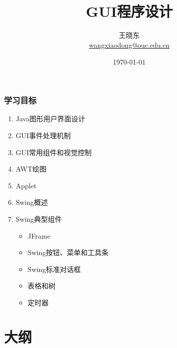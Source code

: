 
\title[KevinW@OUC]{\\  
  GUI程序设计}
\author[王晓东]{王晓东\\
  \href{mailto:wangxiaodong@ouc.edu.cn}{\footnotesize wangxiaodong@ouc.edu.cn}}
\date{\today}


\frame{\titlepage}
\begin{frame}
  \frametitle{学习目标}
  \begin{enumerate}
  \item Java图形用户界面设计
  \item GUI事件处理机制
  \item GUI常用组件和视觉控制
  \item AWT绘图
  \item Applet
  \item Swing概述
  \item Swing典型组件
    \begin{itemize}
    \item JFrame
    \item Swing按钮、菜单和工具条
    \item Swing标准对话框
    \item 表格和树
    \item 定时器
    \end{itemize}
  \end{enumerate}  
\end{frame}

\section*{大纲}

